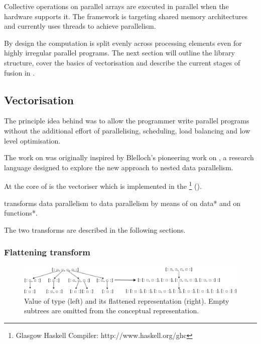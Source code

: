 \documentclass[preamble.tex]{subfiles}
\begin{document}
Collective operations on parallel arrays are executed in parallel when the hardware supports it. The framework is targeting shared memory architectures and currently uses \Haskell threads \cite{Jones08atutorial} to achieve parallelism.

By design the computation is split evenly across processing elements even for highly irregular parallel programs. The next section will outline the library structure, cover the basics of vectorisation and describe the current stages of fusion in \DPH.



\subsection{Vectorisation}
\label{sec:Vectorisation}
\ivect{}

The principle idea behind \DPH was to allow the programmer write parallel programs without the additional effort of parallelising, scheduling, load balancing and low level optimisation.

The work on \DPH was originally inspired by Blelloch's pioneering work on  \cite{BCH+}, a research language designed to explore the new approach to nested data parallelism.

At the core of \DPH is the vectoriser which is implemented in the \footnote{Glasgow Haskell Compiler: http://www.haskell.org/ghc} (\GHC).

\begin{bluebox}
 transforms  data parallelism to  data parallelism by means of  on \*data* and  on \*functions*.
\end{bluebox}

The two transforms are described in the following sections.



\subsubsection{Flattening transform}
\label{sec:Flattening}


\begin{figure}
\includegraphics[width=1\textwidth]{img/TreeRepr}
\caption{Value of type \code{[:Tree:]} (left) and its flattened representation (right). Empty subtrees are omitted from the conceptual representation.%
\label{fig:TreeRepr}}
\end{figure}
\end{document}
